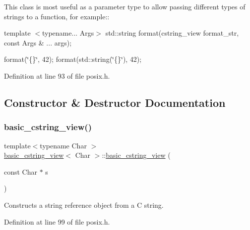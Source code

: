 This class is most useful as a parameter type to allow passing different types of strings to a function, for example\+:\+:

template $<$typename... Args$>$ std\+::string format(cstring\+\_\+view format\+\_\+str, const Args \& ... args);

format(\char`\"{}\{\}\char`\"{}, 42); format(std\+::string(\char`\"{}\{\}\char`\"{}), 42);  

Definition at line 93 of file posix.\+h.



\subsection{Constructor \& Destructor Documentation}
\mbox{\label{classbasic__cstring__view_ab464b2378652892cec4716d3e3d475c7}} 
\subsubsection{\texorpdfstring{basic\+\_\+cstring\+\_\+view()}{basic\_cstring\_view()}\hspace{0.1cm}{\footnotesize\ttfamily [1/2]}}
{\footnotesize\ttfamily template$<$typename Char $>$ \\
\hyperlink{classbasic__cstring__view}{basic\+\_\+cstring\+\_\+view}$<$ Char $>$\+::\hyperlink{classbasic__cstring__view}{basic\+\_\+cstring\+\_\+view} (\begin{DoxyParamCaption}\item[{const Char $\ast$}]{s }\end{DoxyParamCaption})\hspace{0.3cm}{\ttfamily [inline]}}

Constructs a string reference object from a C string. 

Definition at line 99 of file posix.\+h.

\mbox{\label{classbasic__cstring__view_a10b92cc0e3e67789601984099b9ed339}} 
